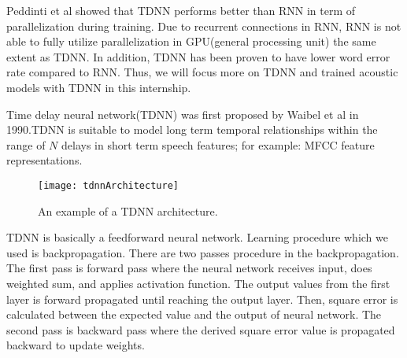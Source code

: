 Peddinti et al showed that TDNN performs better than RNN in term of parallelization during training\cite{Peddinti2015ATD}. Due to recurrent connections in RNN, RNN is not able to fully utilize parallelization in GPU(general processing unit) the same extent as TDNN. In addition, TDNN has been proven to have lower word error rate compared to RNN\cite{Peddinti2015ATD}. Thus, we will focus more on TDNN and trained acoustic models with TDNN in this internship.

Time delay neural network(TDNN) was first proposed by Waibel et al in 1990\cite{Waibel:1990:PRU:108235.108263}.TDNN is suitable to model long term temporal relationships within the range of $N$ delays in short term speech features; for example: MFCC feature representations. %


\begin{figure}

\caption{An example of a TDNN architecture. \cite{Peddinti2015ATD}}
\texttt{[image: tdnnArchitecture]}
\label{tdnnArchitecture}
\centering
\end{figure}



TDNN is basically a feedforward neural network. Learning procedure which we used is backpropagation. There are two passes procedure in the backpropagation. The first pass is forward pass where the neural network receives input, does weighted sum, and applies activation function. The output values from the first layer is forward propagated until reaching the output layer. Then, square error is calculated between the expected value and the output of neural network. The second pass is backward pass where the derived square error value is propagated backward to update weights. 

